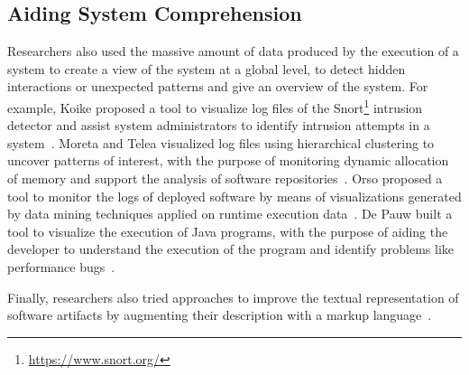\subsection{Aiding System Comprehension}

Researchers also used the massive amount of data produced by the execution of a system to create a view of the system at a global level, to detect hidden interactions or unexpected patterns and give an overview of the system.
For example, Koike proposed a tool to visualize log files of the Snort\footnote{\url{https://www.snort.org/}} intrusion detector and assist system administrators to identify intrusion attempts in a system~\cite{Koik2004}.
Moreta and Telea visualized log files using hierarchical clustering to uncover patterns of interest, with the purpose of monitoring dynamic allocation of memory and support the analysis of software repositories~\cite{More2007}.
Orso \etal proposed a tool to monitor the logs of deployed software by means of visualizations generated by data mining techniques applied on runtime execution data~\cite{Orso2003}.
De Pauw \etal built a tool to visualize the execution of Java programs, with the purpose of aiding the developer to understand the execution of the program and identify problems like performance bugs~\cite{De2002}.


Finally, researchers also tried approaches to improve the textual representation of software artifacts by augmenting their description with a markup language~\cite{Badr2000,Male2002a}.








